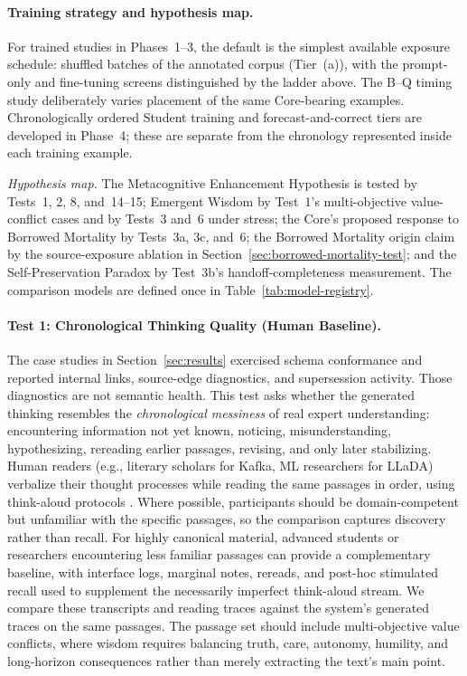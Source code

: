\documentclass[11pt]{article}
\begin{document}
\paragraph{Training strategy and hypothesis map.} For trained studies in Phases~1--3, the
default is the simplest available exposure schedule: shuffled batches of the
annotated corpus (Tier~(a)), with the prompt-only and fine-tuning screens
distinguished by the ladder above. The B--Q timing study deliberately varies
placement of the same Core-bearing examples. Chronologically ordered Student
training and forecast-and-correct tiers are developed in Phase~4; these are
separate from the chronology represented inside each training example.

\emph{Hypothesis map.} The Metacognitive Enhancement Hypothesis is tested by Tests~1, 2,
8, and~14--15; Emergent Wisdom by Test~1's
multi-objective value-conflict cases and by Tests~3 and~6 under stress;
the Core's proposed response to Borrowed Mortality by Tests~3a, 3c, and~6; the
Borrowed Mortality origin claim by the source-exposure ablation in
Section~\ref{sec:borrowed-mortality-test}; and the Self-Preservation Paradox by
Test~3b's handoff-completeness measurement. The comparison models are defined
once in Table~\ref{tab:model-registry}.

\paragraph{Test 1: Chronological Thinking Quality (Human Baseline).}
\label{sec:trace-quality-test}
The case studies in Section~\ref{sec:results} exercised schema
conformance and reported internal links, source-edge diagnostics, and
supersession activity. Those diagnostics are not semantic health. This test asks
whether the generated
thinking resembles the \emph{chronological messiness} of real expert
understanding: encountering information not yet known, noticing,
misunderstanding, hypothesizing, rereading earlier passages, revising, and only
later stabilizing. Human readers (e.g., literary scholars for Kafka, ML
researchers for LLaDA) verbalize their thought processes while reading the
same passages in order, using think-aloud protocols \cite{ericsson1984protocol}.
Where possible, participants should be domain-competent but unfamiliar with the
specific passages, so the comparison captures discovery rather than recall.
For highly canonical material, advanced students or researchers encountering
less familiar passages can provide a complementary baseline, with interface
logs, marginal notes, rereads, and post-hoc stimulated recall used to supplement
the necessarily imperfect think-aloud stream. We compare these transcripts and
reading traces against the system's generated traces on the same passages. The
passage set should include multi-objective value conflicts, where wisdom
requires balancing truth, care, autonomy, humility, and long-horizon
consequences rather than merely extracting the text's main point.
\end{document}
